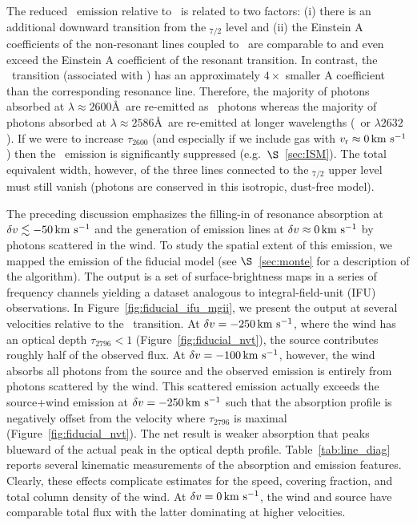 \documentclass[12pt,preprint]{aastex}
\begin{document}
The reduced \feiia\ emission relative to \feiib\ is related to
two factors:
(i) there is an additional downward transition from the
\zconfig$_{7/2}$ level and 
(ii) the Einstein A
coefficients of the non-resonant lines coupled to \feiia\ are comparable to and even
exceed the Einstein A coefficient of
the resonant transition.  In contrast, 
the \feiie\ transition (associated with \feiib)
has an approximately  $4\times$ smaller A coefficient than the
corresponding
resonance line.  Therefore, the majority of photons absorbed at
$\lambda \approx 2600$\AA\ are re-emitted as \feiib\ photons whereas 
the majority of photons absorbed at $\lambda \approx 2586$\AA\ are re-emitted 
at longer wavelengths (\feiic\ or $\lambda 2632$).
If we were to increase $\tau_{2600}$ (and especially if we include
gas with $v_{\rm r} \approx 0 \, {\rm km~s^{-1}}$) then the \feiib\ emission is
significantly suppressed (e.g.\ $\S$~\ref{sec:ISM}).
The total equivalent width, however, of the three lines connected to the
\zconfig$_{7/2}$ upper level must still vanish (photons are conserved
in this isotropic, dust-free model).


The preceding discussion emphasizes the filling-in of resonance
absorption at $\delta v
\lesssim -50 \, {\rm km~s^{-1}}$ and the generation of emission lines at $\delta v \approx
0 \, {\rm km~s^{-1}}$ by photons scattered in the wind.  To study the spatial
extent of this emission, we mapped the emission of the fiducial
model (see $\S$~\ref{sec:monte} for a description of the algorithm).
The output is a set of surface-brightness maps in a series of 
frequency channels yielding a
dataset analogous to integral-field-unit (IFU) observations.  In
Figure~\ref{fig:fiducial_ifu_mgii}, we present the output 
at several velocities relative to the \mgiia\
transition. At $\delta v = -250 \, {\rm km~s^{-1}}$, where the wind has an optical
depth $\tau_{2796} < 1$ (Figure~\ref{fig:fiducial_nvt}),
the source contributes roughly half of the observed flux.  
At $\delta v=-100 \, {\rm km~s^{-1}}$, however, the
wind absorbs all photons from the source and the observed emission is
entirely from photons scattered by the wind.  This scattered emission
actually exceeds the source+wind emission at 
$\delta v = -250 \, {\rm km~s^{-1}}$ such that the absorption profile is
negatively offset from the velocity where $\tau_{2796}$ is maximal
(Figure~\ref{fig:fiducial_nvt}).
The net result is
weaker  absorption that peaks blueward of the actual peak in the
optical depth profile.  
Table~\ref{tab:line_diag} reports several kinematic measurements of
the absorption and emission features.
Clearly, these effects complicate estimates for the
speed, covering fraction, and total column density of the wind.  At
$\delta v = 0 \, {\rm km~s^{-1}}$, the wind and source have comparable total flux with the
latter dominating at higher velocities.  
\end{document}
